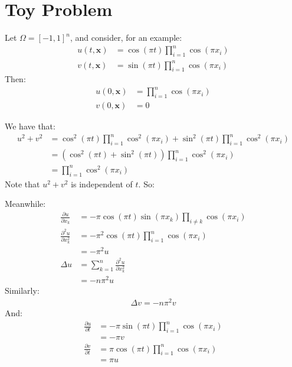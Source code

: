 \documentclass{article}
\newcommand{\bvec}[1]{\boldsymbol{#1}}
\begin{document}
\section{Toy Problem}

Let $\Omega = [-1, 1]^n$, and consider, for an example:
\begin{align*}
    u(t, \bvec{x}) & = \cos(\pi t) \prod_{i = 1}^n \cos(\pi x_i) \\
    v(t, \bvec{x}) & = \sin(\pi t) \prod_{i = 1}^n \cos(\pi x_i)
\end{align*}
\noindent Then:
\begin{align*}
    u(0, \bvec{x}) & = \prod_{i = 1}^n \cos(\pi x_i) \\
    v(0, \bvec{x}) & = 0
\end{align*}

We have that:
\begin{align*}
    u^2 + v^2
        & = \cos^2(\pi t) \prod_{i = 1}^n \cos^2(\pi x_i)
            + \sin^2(\pi t) \prod_{i = 1}^n \cos^2(\pi x_i) \\
        & = (\cos^2(\pi t) + \sin^2(\pi t)) \prod_{i = 1}^n \cos^2(\pi x_i) \\
        & = \prod_{i = 1}^n \cos^2(\pi x_i)
\end{align*}
\noindent Note that $u^2 + v^2$ is independent of $t$. So:

Meanwhile:
\begin{align*}
    \frac{\partial u}{\partial x_k} & = -\pi \cos(\pi t) \sin(\pi x_k) \prod_{i \neq k} \cos(\pi x_i) \\
    \frac{\partial^2 u}{\partial x_k^2} & = -\pi^2 \cos(\pi t) \prod_{i = 1}^n \cos(\pi x_i) \\
        & = -\pi^2 u \\
    \Delta u & = \sum_{k = 1}^n \frac{\partial^2 u}{\partial x_k^2} \\
        & = -n \pi^2 u
\end{align*}
\noindent Similarly:
\begin{align*}
    \Delta v = -n \pi^2 v
\end{align*}
\noindent And:
\begin{align*}
    \frac{\partial u}{\partial t} & = -\pi \sin(\pi t) \prod_{i = 1}^n \cos(\pi x_i) \\
        & = -\pi v \\
    \frac{\partial v}{\partial t} & = \pi \cos(\pi t) \prod_{i = 1}^n \cos(\pi x_i) \\
        & = \pi u
\end{align*}
\end{document}
